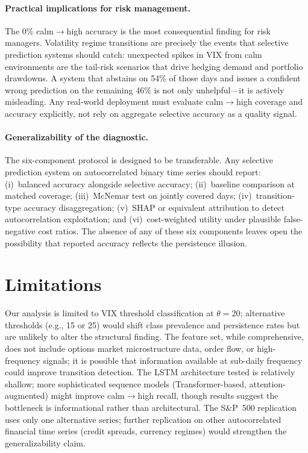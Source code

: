 \documentclass[runningheads]{llncs}
\begin{document}
\paragraph{Practical implications for risk management.}
The 0\% calm$\to$high accuracy is the most consequential finding for
risk managers. Volatility regime transitions are precisely the events that
selective prediction systems should catch: unexpected spikes in VIX from
calm environments are the tail-risk scenarios that drive hedging demand
and portfolio drawdowns. A system that abstains on 54\% of those days and
issues a confident wrong prediction on the remaining 46\% is not only
unhelpful---it is actively misleading. Any real-world deployment must
evaluate calm$\to$high coverage and accuracy explicitly, not rely on
aggregate selective accuracy as a quality signal.

\paragraph{Generalizability of the diagnostic.}
The six-component protocol is designed to be transferable. Any selective
prediction system on autocorrelated binary time series should report:
(i)~balanced accuracy alongside selective accuracy; (ii)~baseline comparison
at matched coverage; (iii)~McNemar test on jointly covered days;
(iv)~transition-type accuracy disaggregation; (v)~SHAP or equivalent
attribution to detect autocorrelation exploitation; and
(vi)~cost-weighted utility under plausible false-negative cost ratios.
The absence of any of these six components leaves open the possibility that
reported accuracy reflects the persistence illusion.


\section{Limitations}

Our analysis is limited to VIX threshold classification at $\theta = 20$;
alternative thresholds (e.g., 15 or 25) would shift class prevalence and
persistence rates but are unlikely to alter the structural finding. The
feature set, while comprehensive, does not include options market microstructure
data, order flow, or high-frequency signals; it is possible that information
available at sub-daily frequency could improve transition detection. The
LSTM architecture tested is relatively shallow; more sophisticated sequence
models (Transformer-based, attention-augmented) might improve calm$\to$high
recall, though results suggest the bottleneck is informational rather than
architectural. The S\&P~500 replication uses only one alternative series;
further replication on other autocorrelated financial time series (credit
spreads, currency regimes) would strengthen the generalizability claim.
\end{document}

